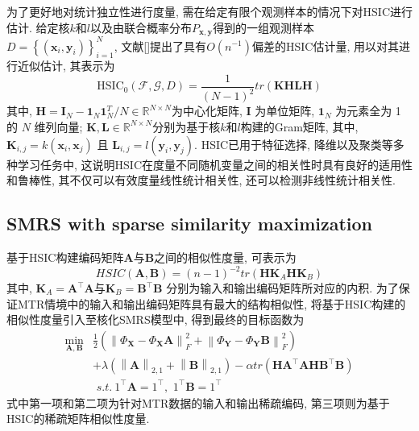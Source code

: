 \documentclass[lang=cn,10pt]{gorgeousnbook}
\numberwithin{equation}{section}%
\numberwithin{figure}{section}%
\begin{document}
为了更好地对统计独立性进行度量, 需在给定有限个观测样本的情况下对HSIC进行估计. 给定核$k$和$l$以及由联合概率分布$P_{\boldsymbol{x,y}}$得到的一组观测样本$D=\left\{ \left( \boldsymbol{x}_i,\boldsymbol{y}_i \right) \right\} _{i=1}^{N}$, 文献[]提出了具有$O\left( n^{-1} \right) $偏差的HSIC估计量, 用以对其进行近似估计, 其表示为
\begin{equation}
\text{HSIC}_0\left( \mathcal{F},\mathcal{G},D \right) =\frac{1}{\left( N-1 \right) ^2}tr\left( \boldsymbol{KHLH} \right) 
\end{equation}
其中, $\boldsymbol{H}=\boldsymbol{I}_N-\boldsymbol{1}_N\boldsymbol{1}_N^{T}/{N}\in \mathbb{R}^{N\times N}$为中心化矩阵, $\boldsymbol{I}$ 为单位矩阵, $\boldsymbol{1}_N$ 为元素全为 1 的 $N$ 维列向量; $\boldsymbol{K},\boldsymbol{L}\in \mathbb{R}^{N\times N}$分别为基于核$k$和$l$构建的Gram矩阵, 其中, $\boldsymbol{K}_{i,j}=k\left( \boldsymbol{x}_i,\boldsymbol{x}_j \right) $ 且 $\boldsymbol{L}_{i,j}=l\left( \boldsymbol{y}_i,\boldsymbol{y}_j \right) $. 
HSIC已用于特征选择, 降维以及聚类等多种学习任务中, 这说明HSIC在度量不同随机变量之间的相关性时具有良好的适用性和鲁棒性, 其不仅可以有效度量线性统计相关性, 还可以检测非线性统计相关性.




\subsection{SMRS with sparse similarity maximization}
基于HSIC构建编码矩阵$\bm{A}$与$\bm{B}$之间的相似性度量, 可表示为
\begin{equation}
    HSIC(\bm{A},\bm{B}) = (n-1)^{-2}tr(\bm{HK}_A\bm{HK}_B)
\end{equation}
其中, $\bm{K}_A = \bm{A}^{\top}\bm{A}$与$\bm{K}_B = \bm{B}^{\top}\bm{B}$ 分别为输入和输出编码矩阵所对应的内积. 为了保证MTR情境中的输入和输出编码矩阵具有最大的结构相似性, 将基于HSIC构建的相似性度量引入至核化SMRS模型中, 得到最终的目标函数为
\begin{equation}
    \begin{aligned}
    \min_{\boldsymbol{A},\boldsymbol{B}} &\frac{1}{2}\left( \left\| \varPhi _{\boldsymbol{X}}-\varPhi _{\boldsymbol{X}}\boldsymbol{A} \right\| _{F}^{2}+\left\| \varPhi _{\boldsymbol{Y}}-\varPhi _{\boldsymbol{Y}}\boldsymbol{B} \right\| _{F}^{2} \right) \\
    &+\lambda \left( \left\| \boldsymbol{A} \right\| _{2,1}+\left\| \boldsymbol{B} \right\| _{2,1} \right) -\alpha tr\left( \boldsymbol{HA}^{\top}\boldsymbol{AHB}^{\top}\boldsymbol{B} \right) \\
    &\,\,s.t.\ 1^{\top}\boldsymbol{A}=1^{\top},\,\,1^{\top}\boldsymbol{B}=1^{\top}
    \end{aligned}\label{smrsssm}
\end{equation}
式中第一项和第二项为针对MTR数据的输入和输出稀疏编码, 第三项则为基于HSIC的稀疏矩阵相似性度量. 
\end{document}
